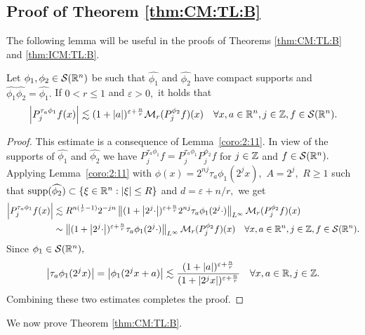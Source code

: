  
 \subsection{Proof of Theorem \ref{thm:CM:TL:B}}
 
The following lemma will be useful in the proofs of Theorems \ref{thm:CM:TL:B} and \ref{thm:ICM:TL:B}.

\begin{lemma}\label{lem:pointineq} Let $\phi_1,\phi_2\in {\mathcal{S}}({{\mathbb R}^n})$ be  such that $\widehat{\phi_1}$ and $\widehat{\phi_2}$ have compact supports and  $\widehat{\phi_1}\widehat{\phi_2}=\widehat{\phi_1}.$  If $0<r\le 1$ and $\varepsilon>0,$ it holds that
\begin{align*}
\left\vert P^{\tau_a\phi_1}_{j}f(x) \right\vert\lesssim (1+\left\vert a \right\vert)^{\varepsilon+\frac{n}{r}} \mathcal{M}_r(P^{\phi_2}_{j}f)(x)\quad \forall x,a\in{{\mathbb R}^n}, j\in\mathbb{Z}, f\in{\mathcal{S}}({{\mathbb R}^n}).
\end{align*}
\end{lemma}

\begin{proof} This estimate is a consequence of Lemma~\ref{coro:2:11}. In view of the supports of $\widehat{\phi_1}$ and $\widehat{\phi_2}$ we have $P^{\tau_a\phi_1}_{j}f=P^{\tau_a\phi_1}_{j}P^{\phi_2}_{j}f$ for  $j\in \mathbb{Z} $ and $f\in {\mathcal{S}}({{\mathbb R}^n}).$ Applying Lemma~\ref{coro:2:11} with $\phi(x)=2^{nj}\tau_a \phi_1(2^j x),$ $A=2^j,$ $R\ge 1$ such that ${\rm{supp}}(\widehat{\phi_2})\subset \{\xi\in{{\mathbb R}^n}:\left\vert \xi \right\vert\le R\}$ and $d=\varepsilon+n/r,$ we get
\begin{align*}
\left\vert P^{\tau_a\phi_1}_{j}f(x) \right\vert&\lesssim R^{n(\frac{1}{r}-1)} 2^{-jn}\left\|(1+\left\vert 2^j\cdot \right\vert)^{\varepsilon+\frac{n}{r}}2^{nj}\tau_a \phi_1(2^j\cdot)\right\|_{L^\infty}\mathcal{M}_r(P^{\phi_2}_{j}f)(x)\\
&\sim \left\|(1+\left\vert 2^j\cdot \right\vert)^{\varepsilon+\frac{n}{r}}\tau_a \phi_1(2^j\cdot)\right\|_{L^\infty}\mathcal{M}_r(P^{\phi_2}_{j}f)(x)\quad \forall x,a\in {{\mathbb R}^n}, j\in \mathbb{Z}, f\in{\mathcal{S}}({{\mathbb R}^n}).
\end{align*}
Since $\phi_1\in {\mathcal{S}}({{\mathbb R}^n}),$ 
\[
\left\vert \tau_a \phi_1(2^jx) \right\vert=\left\vert \phi_1(2^j x +a) \right\vert\lesssim \frac{(1+\left\vert a \right\vert)^{\varepsilon+\frac{n}{r}}}{(1+\left\vert 2^jx \right\vert)^{\varepsilon+\frac{n}{r}}}\quad \forall x,a\in \mathbb{R},j\in \mathbb{Z}.
\]
Combining these two estimates completes the proof.
\end{proof}

We now prove Theorem \ref{thm:CM:TL:B}.
 
